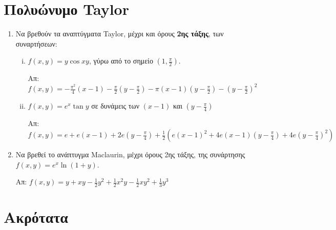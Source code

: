 \section*{Πολυώνυμο Taylor}

\begin{enumerate}
  \item Να βρεθούν τα αναπτύγματα Taylor, μέχρι και όρους 
    \textbf{2ης τάξης}, των συναρτήσεων:

    \begin{enumerate}[i)]
      \item  $f(x,y)=y\cos{xy} $, γύρω από το σημείο 
        $ \left(1, \frac{ \pi }{ 2 }\right) $.

        \hfill Απ: $f(x,y)=-\frac{\pi^{2}}{4}(x-1) - \frac{ \pi }{ 2 } 
        \left(y - \frac{ \pi }{2 }\right) - \pi(x-1)
        \left(y-\frac{\pi}{2}\right)- \left(y- \frac{ \pi }{ 2} \right)^{2} $

      \item $ f(x,y)=e^{x}\tan{y} $ σε δυνάμεις των $ (x-1) $ και 
        $ \left(y - \frac{ \pi }{ 4 }\right) $

        \hfill Απ: $ f(x,y) = e + e(x-1) + 2e\left(y- \frac{ \pi }{ 4 }\right)
        + \frac{1}{ 2 } \left(e(x-1)^{2}+4e(x-1)\left(y- \frac{ \pi }{ 4 }
        \right) + 4e\left(y- \frac{ \pi }{ 4 } \right)^{2}\right) $
    \end{enumerate}

  \item Να βρεθεί το ανάπτυγμα Maclaurin, μέχρι όρους 2ης τάξης, 
    της συνάρτησης $ f(x,y) = e^{x}\ln(1+y)$.

    \hfill Απ: $ f(x,y)=y + xy - \frac{1}{ 2 } y^{2} + \frac{1}{ 2 } x^{2}y - 
    \frac{1}{ 2 } xy^{2} + \frac{1}{ 3 } y^{3} $
\end{enumerate}

\section*{Ακρότατα}

